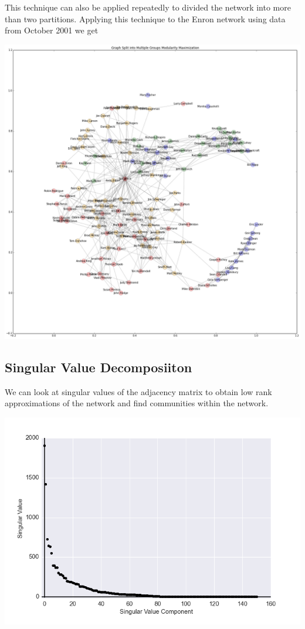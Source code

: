 \documentclass[12pt]{article}
\begin{document}
	This technique can also be applied repeatedly to divided the network into more than two partitions. Applying this technique to the Enron network using data from October 2001 we get
	
	\includegraphics[width=1\textwidth]{figureEnronPartitionMult}



	\subsection{Singular Value Decomposiiton}
		We can look at singular values of the adjacency matrix to obtain low rank approximations of the network and find communities within the network. 
		

\includegraphics[width=1\textwidth]{SingularValues}
\end{document}
